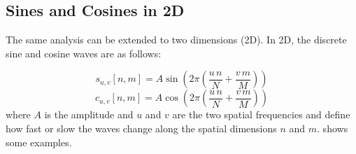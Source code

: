 \subsection{Sines and Cosines in 2D}

The same analysis can be extended to two dimensions (2D). In 2D, the discrete sine and cosine waves are as follows:

\begin{equation}
	s_{u,v}\left[n,m\right] = A \sin \left(2 \pi \left( \frac{u\,n}{N}  + \frac{v\,m}{M}  \right) \right)
\end{equation}
\begin{equation}
	c_{u,v}\left[n,m\right] = A \cos \left(2 \pi \left( \frac{u\,n}{N}  + \frac{v\,m}{M}  \right) \right)
\end{equation}
where $A$ is the amplitude and $u$ and $v$ are the two spatial frequencies and define how fast or slow the waves change along the spatial dimensions $n$ and $m$. \Fig{\ref{fig:disc2Dsignal}} shows some examples.
